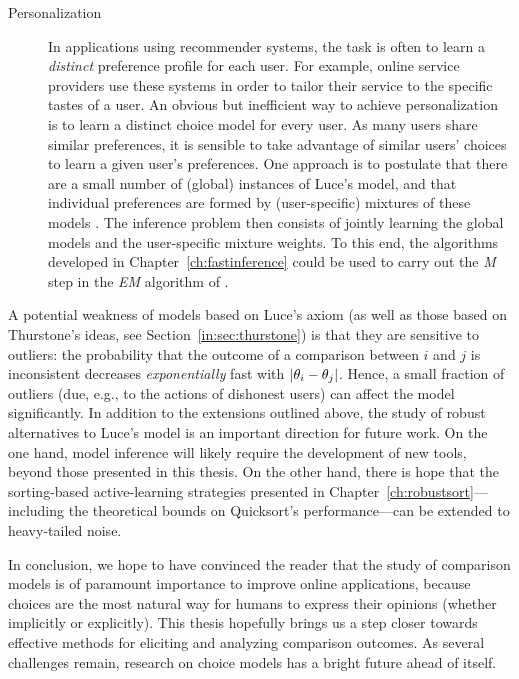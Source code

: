 \begin{description}
\item[Personalization] In applications using recommender systems, the task is often to learn a \emph{distinct} preference profile for each user.
For example, online service providers use these systems in order to tailor their service to the specific tastes of a user.
An obvious but inefficient way to achieve personalization is to learn a distinct choice model for every user.
As many users share similar preferences, it is sensible to take advantage of similar users' choices to learn a given user's preferences.
One approach is to postulate that there are a small number of (global) instances of Luce's model, and that individual preferences are formed by (user-specific) mixtures of these models \citep{gormley2008exploring, ammar2015ranked}.
The inference problem then consists of jointly learning the global models and the user-specific mixture weights.
To this end, the algorithms developed in Chapter~\ref{ch:fastinference} could be used to carry out the \emph{M} step in the \emph{EM} algorithm of \citet{gormley2008exploring}.
\end{description}

A potential weakness of models based on Luce's axiom (as well as those based on Thurstone's ideas, see Section~\ref{in:sec:thurstone}) is that they are sensitive to outliers: the probability that the outcome of a comparison between $i$ and $j$ is inconsistent decreases \emph{exponentially} fast with $\lvert\theta_i - \theta_j\rvert$.
Hence, a small fraction of outliers (due, e.g., to the actions of dishonest users) can affect the model significantly.
In addition to the extensions outlined above, the study of robust alternatives to Luce's model is an important direction for future work.
On the one hand, model inference will likely require the development of new tools, beyond those presented in this thesis.
On the other hand, there is hope that the sorting-based active-learning strategies presented in Chapter~\ref{ch:robustsort}---including the theoretical bounds on Quicksort's performance---can be extended to heavy-tailed noise.

In conclusion, we hope to have convinced the reader that the study of comparison models is of paramount importance to improve online applications, because choices are the most natural way for humans to express their opinions (whether implicitly or explicitly).
This thesis hopefully brings us a step closer towards effective methods for eliciting and analyzing comparison outcomes.
As several challenges remain, research on choice models has a bright future ahead of itself.
